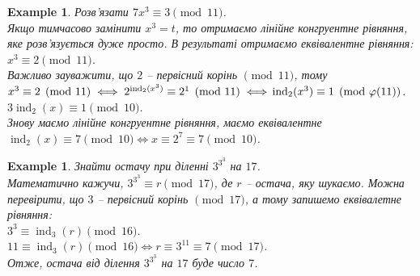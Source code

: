 \documentclass[a4paper, 14pt]{extarticle}
\theoremstyle{theoremdd}
\theoremstyle{theoremdd}
\theoremstyle{theoremdd}
\theoremstyle{theoremdd}
\newtheorem{example}[theorem]{Example}
\theoremstyle{theoremdd}
\theoremstyle{theoremdd}
\newtheorem{remark}[theorem]{Remark}
\theoremstyle{theoremdd}
\theoremstyle{theoremdd}
\def\rightproof{$\boxed{\Rightarrow}$ }
\DeclareMathOperator{\ord}{ord}
\DeclareMathOperator{\ind}{ind}
\begin{document}
\iffalse
\begin{remark}
Окремо поясню, що $\ord_{2^{n}} (5) = 2^{n-2} \iff \begin{cases} 2^n \mid 5^{2^{n-2}}-1 \\ 2^{n+1} \nmid 5^{2^{n-2}} - 1 \end{cases}$, бо щось довго з цим мучався.\\
\rightproof Дано: $\ord_{2^n}(5) = 2^{n-2}$, тобто $5^{2^{n-2}} \equiv 1 \pmod {2^n}$. Тоді очевидно маємо перший рядок системи.\\
!Нехай $2^{n+1} \mid 5^{2^{n-2}}-1$, тоді звідси $5^{2^{n-2}} \equiv 1 \pmod {2^{n+1}}$. Тоді звідси $\ord_{2^{n+1}}(5) \mid 2^{n-2}$.\\
Водночас $5^{\ord_{2^{n+1}}(5)} \equiv 1 \pmod {2^n}$, тож звідси $2^{n-2} \mid \ord_{2^{n+1}}(5)$, тобто \\ $\ord_{2^{n+1}}(5) = 2^{n-2}$.
\end{remark}
\fi

\begin{example}
Розв'язати $7x^3 \equiv 3 \pmod {11}$.\\
Якщо тимчасово замінити $x^3 = t$, то отримаємо лінійне конгруентне рівняння, яке розв'язується дуже просто. В результаті отримаємо еквівалентне рівняння:\\
$x^3 \equiv 2 \pmod {11}$.\\
Важливо зауважити, що $2$ -- первісний корінь $\!\! \pmod {11}$, тому\\
$x^3 \equiv 2 \pmod {11} \iff 2^{\ind_2 (x^3)} \equiv 2^1 \pmod {11} \iff \\
\ind_2 (x^3) \equiv 1 \pmod {\varphi(11)}$.\\
$3 \ind_2 (x) \equiv 1 \pmod {10}$.\\
Знову маємо лінійне конгруентне рівняння, маємо еквівалентне\\
$\ind_2 (x) \equiv 7 \pmod {10} \iff x \equiv 2^7 \equiv 7 \pmod {10}$.
\end{example}

\begin{example}
Знайти остачу при діленні $3^{3^3}$ на $17$.\\
Математично кажучи, $3^{3^3} \equiv r \pmod {17}$, де $r$ -- остача, яку шукаємо. Можна перевірити, що $3$ -- первісний корінь $\pmod {17}$, а тому запишемо еквівалетне рівняння:\\
$3^3 \equiv \ind_3 (r) \pmod {16}$.\\
$11 \equiv \ind_3 (r) \pmod {16} \iff r \equiv 3^{11} \equiv 7 \pmod {17}$.\\
Отже, остача від ділення $3^{3^3}$ на $17$ буде число $7$.
\end{example}
\end{document}
